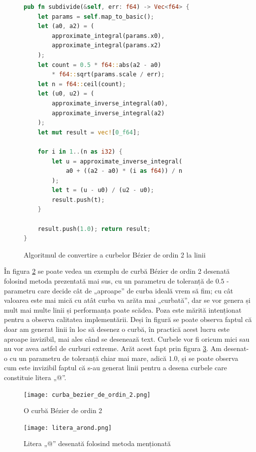 \documentclass[a4paper, 12pt]{report}
\begin{document}
\begin{figure}[ht]
    \centering
    \begin{lstlisting}[language=Rust]
pub fn subdivide(&self, err: f64) -> Vec<f64> {
    let params = self.map_to_basic();
    let (a0, a2) = (
        approximate_integral(params.x0),
        approximate_integral(params.x2)
    );
    let count = 0.5 * f64::abs(a2 - a0)
        * f64::sqrt(params.scale / err);
    let n = f64::ceil(count);
    let (u0, u2) = (
        approximate_inverse_integral(a0),
        approximate_inverse_integral(a2)
    );
    let mut result = vec![0_f64];

    for i in 1..(n as i32) {
        let u = approximate_inverse_integral(
            a0 + ((a2 - a0) * (i as f64)) / n
        );
        let t = (u - u0) / (u2 - u0);
        result.push(t);
    }

    result.push(1.0); return result;
}
    \end{lstlisting}
    \caption{Algoritmul de convertire a curbelor Bézier de ordin 2 la linii}
    \label{fig-quadbezier-subdivide}
\end{figure}

În figura \ref{fig-curba-bezier-de-ordin-2} se poate vedea un exemplu de curbă Bézier de ordin 2 desenată folosind metoda
prezentată mai sus, cu un parametru de toleranță de \(0.5\) - parametru care decide cât de „aproape” de curba ideală vrem
să fim; cu cât valoarea este mai mică cu atât curba va arăta mai „curbată”, dar se vor genera și mult mai multe linii și
performanța poate scădea. Poza este mărită intenționat pentru a observa calitatea implementării. Deși în figură se poate observa
faptul că doar am generat linii în loc să desenez o curbă, în practică acest lucru este aproape invizibil, mai ales când
se desenează text. Curbele vor fi oricum mici sau nu vor avea astfel de curburi extreme. Arăt acest fapt prin figura
\ref{fig-litera-arond}. Am desenat-o cu un parametru de toleranță chiar mai mare, adică \(1.0\), și se poate observa cum
este invizibil faptul că s-au generat linii pentru a desena curbele care constituie litera „@”.

\begin{figure}[ht]
    \texttt{[image: curba\_bezier\_de\_ordin\_2.png]}
    \centering
    \caption{O curbă Bézier de ordin 2}
    \label{fig-curba-bezier-de-ordin-2}
\end{figure}

\begin{figure}[ht]
    \texttt{[image: litera\_arond.png]}
    \centering
    \caption{Litera „@” desenată folosind metoda menționată}
    \label{fig-litera-arond}
\end{figure}
\end{document}
